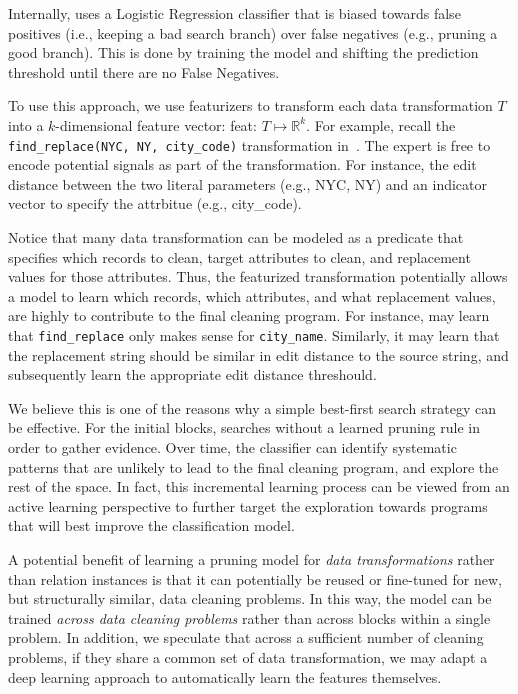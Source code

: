 Internally, \sys uses a Logistic Regression classifier that is biased towards false positives (i.e., keeping a bad search branch) over false negatives (e.g., pruning a good branch). This is done by training the model and shifting the prediction threshold until there are no False Negatives. 


To use this approach, we use featurizers to transform each data transformation $T$ into a $k$-dimensional feature vector: \textsf{feat}: $T\mapsto\mathbb{R}^k$.
For example, recall the \texttt{find\_replace(NYC, NY, city\_code)} transformation in~.
The expert is free to encode potential signals as part of the transformation.  For instance, the edit distance between the two literal parameters (e.g., NYC, NY) and an indicator vector to specify the attrbitue (e.g., city\_code).  

Notice that many data transformation can be modeled as a predicate that specifies which records to clean, target attributes to clean, and replacement values for those attributes.  Thus, the featurized transformation potentially allows a model to learn which records, which attributes, and what replacement values, are highly to contribute to the final cleaning program.  For instance, \sys may learn that \texttt{find\_replace} only makes sense for \texttt{city\_name}.  Similarly, it may learn that the replacement string should be similar in edit distance to the source string, and subsequently learn the appropriate edit distance threshould.


 We believe this is one of the reasons why a simple best-first search strategy can be effective.  For the initial blocks, \sys searches without a learned pruning rule in order to gather evidence.  Over time, the classifier can identify systematic patterns that are unlikely to lead to the final cleaning program, and explore the rest of the space.  In fact, this incremental learning process can be viewed from an active learning perspective to further target the exploration towards programs that will best improve the classification model.  

A potential benefit of learning a pruning model for {\it data transformations} rather than relation instances is that it can potentially be reused or fine-tuned for new, but structurally similar, data cleaning problems. In this way, the model can be trained {\it across data cleaning problems} rather than across blocks within a single problem.    In addition, we speculate that across a sufficient number of cleaning problems, if they share a common set of data transformation, we may adapt a deep learning approach to automatically learn the features themselves.  


